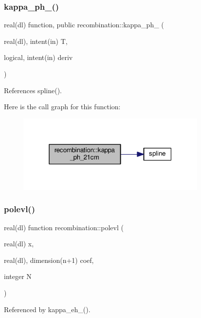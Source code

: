 \subsubsection{\texorpdfstring{kappa\+\_\+ph\+\_\+21cm()}{kappa\_ph\_21cm()}}
{\footnotesize\ttfamily real(dl) function, public recombination\+::kappa\+\_\+ph\+\_\+21cm (\begin{DoxyParamCaption}\item[{real(dl), intent(in)}]{T,  }\item[{logical, intent(in)}]{deriv }\end{DoxyParamCaption})}



References spline().

Here is the call graph for this function\+:
\nopagebreak
\begin{figure}[H]
\begin{center}
\leavevmode
\includegraphics[width=268pt]{namespacerecombination_a27e7c8f022215a5bb27a45d2b5db20bb_cgraph}
\end{center}
\end{figure}
\mbox{\label{namespacerecombination_abd7e507e301ec237a76ea22d6a6be0eb}} 
\subsubsection{\texorpdfstring{polevl()}{polevl()}}
{\footnotesize\ttfamily real(dl) function recombination\+::polevl (\begin{DoxyParamCaption}\item[{real(dl)}]{x,  }\item[{real(dl), dimension(n+1)}]{coef,  }\item[{integer}]{N }\end{DoxyParamCaption})}



Referenced by kappa\+\_\+eh\+\_\+21cm().

